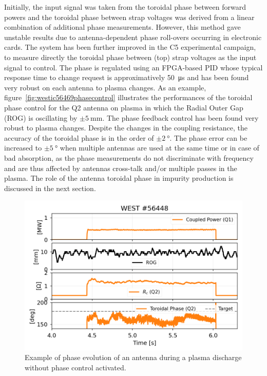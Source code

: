 \documentclass[12p]{iopart}
\begin{document}
Initially, the input signal was taken from the toroidal phase between forward powers and the toroidal phase between strap voltages was derived from a linear combination of additional phase measurements. However, this method gave unstable results due to antenna-dependent phase roll-overs occurring in electronic cards. The system has been further improved in the C5 experimental campaign, to measure directly the toroidal phase between (top) strap voltages as the input signal to control. The phase is regulated using an FPGA-based PID whose typical response time to change request is approximatively \SI{50}{\micro\second} and has been found very robust on each antenna to plasma changes. As an example, figure~\ref{fig:westic56469phasecontrol} illustrates the performances of the toroidal phase control for the Q2 antenna on plasma in which the Radial Outer Gap (ROG) is oscillating by $\pm\SI{5}{\milli\meter}$. The phase feedback control has been found very robust to plasma changes. Despite the changes in the coupling resistance, the accuracy of the toroidal phase is in the order of $\pm\SI{2}{\degree}$. The phase error can be increased to $\pm\SI{5}{\degree}$ when multiple antennas are used at the same time or in case of bad absorption, as the phase measurements do not discriminate with frequency and are thus affected by antennas cross-talk and/or multiple passes in the plasma. The role of the antenna toroidal phase in impurity production is discussed in the next section. 

\begin{figure}
	\centering
	\includegraphics[width=0.95\linewidth]{figures/WEST_IC_56448}
	\caption{Example of phase evolution of an antenna during a plasma discharge without phase control activated.}
	\label{fig:westic56468withoutphasecontrol}
\end{figure}
\end{document}
